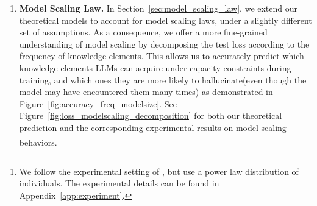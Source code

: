 \documentclass[11pt]{article}
\theoremstyle{plain}
\theoremstyle{definition}
\begin{document}
\begin{enumerate}
    \item \textbf{Model Scaling Law.} 
    In Section~\ref{sec:model_scaling_law}, we extend our theoretical models to account for model scaling laws, under a slightly different set of assumptions. As a consequence, we offer a more fine-grained understanding of model scaling by decomposing the test loss according to the frequency of knowledge elements. This allows us to accurately predict which knowledge elements LLMs can acquire under capacity constraints during training, and which ones they are more likely to hallucinate(even though the model may have encountered them many times) as demonstrated in Figure~\ref{fig:accuracy_freq_modelsize}.
    See Figure~\ref{fig:loss_modelscaling_decomposition} 
    for both our theoretical prediction and the corresponding experimental results on model scaling behaviors. 
    \footnote{
    We follow the experimental setting of \cite{AllenZhu-icml2024-tutorial,allen2024physics}, but use a power law distribution of individuals. The experimental details can be found in Appendix~\ref{app:experiment}.
    }
    
\end{enumerate}
\end{document}
